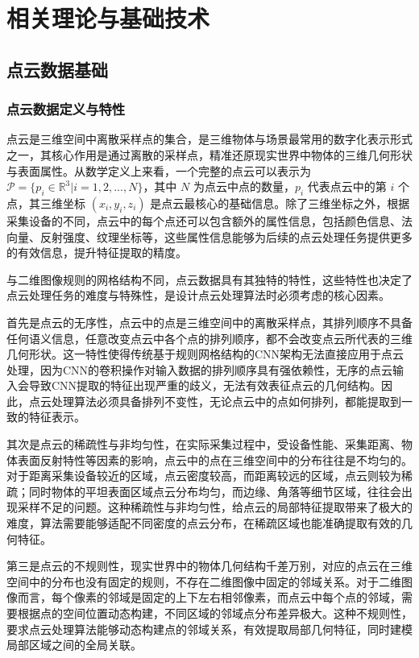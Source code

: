 \chapter{相关理论与基础技术}
\label{chap:theory} 

\section{点云数据基础}

\subsection{点云数据定义与特性}
点云是三维空间中离散采样点的集合，是三维物体与场景最常用的数字化表示形式之一，其核心作用是通过离散的采样点，精准还原现实世界中物体的三维几何形状与表面属性。从数学定义上来看，一个完整的点云可以表示为 $\mathcal{P} = \{p_i \in \mathbb{R}^3 | i=1,2,...,N\}$，其中 $N$ 为点云中点的数量，$p_i$ 代表点云中的第 $i$ 个点，其三维坐标 $(x_i,y_i,z_i)$ 是点云最核心的基础信息。除了三维坐标之外，根据采集设备的不同，点云中的每个点还可以包含额外的属性信息，包括颜色信息、法向量、反射强度、纹理坐标等，这些属性信息能够为后续的点云处理任务提供更多的有效信息，提升特征提取的精度。

与二维图像规则的网格结构不同，点云数据具有其独特的特性，这些特性也决定了点云处理任务的难度与特殊性，是设计点云处理算法时必须考虑的核心因素。

首先是点云的无序性，点云中的点是三维空间中的离散采样点，其排列顺序不具备任何语义信息，任意改变点云中各个点的排列顺序，都不会改变点云所代表的三维几何形状。这一特性使得传统基于规则网格结构的CNN架构无法直接应用于点云处理，因为CNN的卷积操作对输入数据的排列顺序具有强依赖性，无序的点云输入会导致CNN提取的特征出现严重的歧义，无法有效表征点云的几何结构。因此，点云处理算法必须具备排列不变性，无论点云中的点如何排列，都能提取到一致的特征表示。

其次是点云的稀疏性与非均匀性，在实际采集过程中，受设备性能、采集距离、物体表面反射特性等因素的影响，点云中的点在三维空间中的分布往往是不均匀的。对于距离采集设备较近的区域，点云密度较高，而距离较远的区域，点云则较为稀疏；同时物体的平坦表面区域点云分布均匀，而边缘、角落等细节区域，往往会出现采样不足的问题。这种稀疏性与非均匀性，给点云的局部特征提取带来了极大的难度，算法需要能够适配不同密度的点云分布，在稀疏区域也能准确提取有效的几何特征。

第三是点云的不规则性，现实世界中的物体几何结构千差万别，对应的点云在三维空间中的分布也没有固定的规则，不存在二维图像中固定的邻域关系。对于二维图像而言，每个像素的邻域是固定的上下左右相邻像素，而点云中每个点的邻域，需要根据点的空间位置动态构建，不同区域的邻域点分布差异极大。这种不规则性，要求点云处理算法能够动态构建点的邻域关系，有效提取局部几何特征，同时建模局部区域之间的全局关联。

